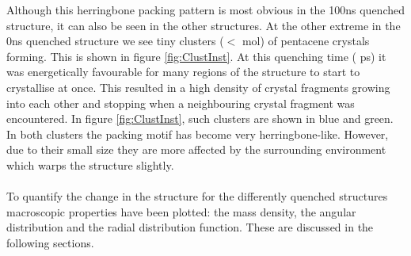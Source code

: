 Although this herringbone packing pattern is most obvious in the 100ns quenched structure, it can also be seen in the other structures. At the other extreme in the 0ns quenched structure we see tiny clusters ($<$ mol) of pentacene crystals forming. This is shown in figure \ref{fig:ClustInst}. At this quenching time ( ps) it was energetically favourable for many regions of the structure to start to crystallise at once. This resulted in a high density of crystal fragments growing into each other and stopping when a neighbouring crystal fragment was encountered. In figure \ref{fig:ClustInst},  such clusters are shown in blue and green. In both clusters the packing motif has become very herringbone-like. However, due to their small size they are more affected by the surrounding environment which warps the structure slightly. 
\\\\
\noindent To quantify the change in the structure for the differently quenched structures  macroscopic properties have been plotted: the mass density, the angular distribution and the radial distribution function. These are discussed in the following sections.
